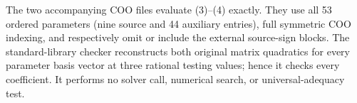 \documentclass[10pt]{article}
\begin{document}
The two accompanying COO files evaluate (3)--(4) exactly. They use all
53 ordered parameters (nine source and 44 auxiliary entries), full symmetric
COO indexing, and respectively omit or include the external source-sign
blocks. The standard-library checker reconstructs both original matrix
quadratics for every parameter basis vector at three rational testing
values; hence it checks every coefficient. It performs no solver call,
numerical search, or universal-adequacy test.
\end{document}
